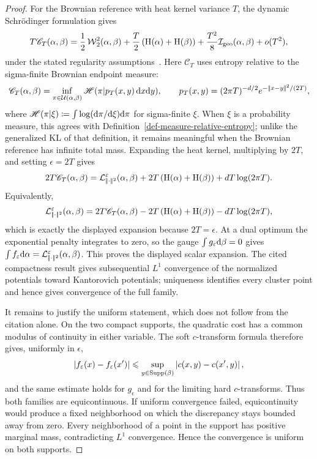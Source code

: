 \begin{proof}
	For the Brownian reference with heat kernel variance $T$, the dynamic Schr\"odinger formulation gives
	\[
		T\mathscr C_T(\alpha,\beta)
		=
		\frac12\operatorname{\mathcal{W}}_2^2(\alpha,\beta)
		+\frac{T}{2}\left( \mathrm H(\alpha)+\mathrm H(\beta) \right)
		+\frac{T^2}{8}\mathcal I_{\rm geo}(\alpha,\beta)+o(T^2),
	\]
	under the stated regularity assumptions~\cite{ConfortiTamanini2021EntropicDerivative}. Here $\mathscr C_T$ uses entropy relative to the sigma-finite Brownian endpoint measure:
	\[
		\mathscr C_T(\alpha,\beta)
		=
		\inf_{\pi\in\mathcal{U}(\alpha,\beta)}
		\mathscr H(\pi|p_T(x,y)\,\mathrm{d} x\mathrm{d} y),
		\qquad
		p_T(x,y)=(2\pi T)^{-d/2}e^{-|\!| x-y |\!|^2/(2T)},
	\]
	where $\mathscr H(\pi|\xi)\coloneqq\int\log(\mathrm{d}\pi/\mathrm{d}\xi)\mathrm{d}\pi$ for sigma-finite $\xi$. When $\xi$ is a probability measure, this agrees with Definition~\ref{def-measure-relative-entropy}; unlike the generalized KL of that definition, it remains meaningful when the Brownian reference has infinite total mass. Expanding the heat kernel, multiplying by $2T$, and setting $\epsilon=2T$ gives
	\[
		2T\mathscr C_T(\alpha,\beta)
		=
		\mathcal{L}_{|\!| \cdot |\!|^2}^{\varepsilon}(\alpha,\beta)
		+2T\left( \mathrm H(\alpha)+\mathrm H(\beta) \right)
		+dT\log(2\pi T).
	\]
	Equivalently,
	\[
		\mathcal{L}_{|\!| \cdot |\!|^2}^{\varepsilon}(\alpha,\beta)
		=
		2T\mathscr C_T(\alpha,\beta)
		-2T\left( \mathrm H(\alpha)+\mathrm H(\beta) \right)
		-dT\log(2\pi T),
	\]
	which is exactly the displayed expansion because $2T=\epsilon$. At a dual optimum the exponential penalty integrates to zero, so the gauge $\int g_\varepsilon\mathrm{d}\beta=0$ gives $\int f_\varepsilon\mathrm{d}\alpha=\mathcal{L}_{|\!| \cdot |\!|^2}^\varepsilon(\alpha,\beta)$. This proves the displayed scalar expansion. The cited compactness result gives subsequential $L^1$ convergence of the normalized potentials toward Kantorovich potentials; uniqueness identifies every cluster point and hence gives convergence of the full family.

	It remains to justify the uniform statement, which does not follow from the citation alone. On the two compact supports, the quadratic cost has a common modulus of continuity in either variable. The soft $c$-transform formula therefore gives, uniformly in $\epsilon$,
	\[
		\left\lvert f_\varepsilon(x)-f_\varepsilon(x')\right\rvert
		\leqslant\sup_{y\in\operatorname{Supp}(\beta)}\left\lvert c(x,y)-c(x',y)\right\rvert,
	\]
	and the same estimate holds for $g_\epsilon$ and for the limiting hard $c$-transforms. Thus both families are equicontinuous. If uniform convergence failed, equicontinuity would produce a fixed neighborhood on which the discrepancy stays bounded away from zero. Every neighborhood of a point in the support has positive marginal mass, contradicting $L^1$ convergence. Hence the convergence is uniform on both supports.
\end{proof}

